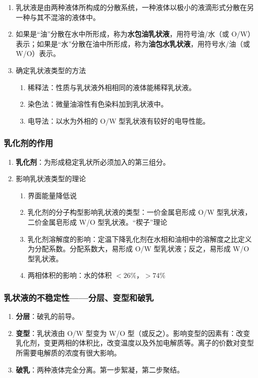 \begin{enumerate}
    \item 乳状液是由两种液体所构成的分散系统，一种液体以极小的液滴形式分散在另一种与其不混溶的液体中。
    \item 如果是“油”分散在水中所形成，称为\textbf{水包油乳状液}，用符号油/水（或 O/W）表示；如果是“水”分散在油中所形成，称为\textbf{油包水乳状液}，用符号水/油（或 W/O）表示。
    \item 确定乳状液类型的方法
    \begin{enumerate}
        \item 稀释法：性质与乳状液外相相同的液体能稀释乳状液。
        \item 染色法：微量油溶性有色染料加到乳状液中。
        \item 电导法：以水为外相的 O/W 型乳状液有较好的电导性能。
    \end{enumerate}
\end{enumerate}

\subsubsection{乳化剂的作用}

\begin{enumerate}
    \item \textbf{乳化剂}：为形成稳定乳状所必须加入的第三组分。
    \item 影响乳状液类型的理论
    \begin{enumerate}
        \item 界面能量降低说
        \item 乳化剂的分子构型影响乳状液的类型：一价金属皂形成 O/W 型乳状液，二价金属皂形成 W/O 型乳状液。“楔子”理论
        \item 乳化剂溶解度的影响：定温下降乳化剂在水相和油相中的溶解度之比定义为分配系数。分配系数大，易形成 O/W 型乳状液；反之，易形成 W/O 型乳状液。
        \item 两相体积的影响：水的体积 $< 26 \%$，$> 74 \%$
    \end{enumerate} 
\end{enumerate}

\subsubsection{乳状液的不稳定性——分层、变型和破乳}

\begin{enumerate}
    \item \textbf{分层}：破乳的前导。
    \item \textbf{变型}：乳状液由 O/W 型变为 W/O 型（或反之）。影响变型的因素有：改变乳化剂，变更两相的体积比，改变温度以及外加电解质等。离子的价数对变型所需要电解质的浓度有很大影响。
    \item \textbf{破乳}：两种液体完全分离。第一步絮凝，第二步聚结。
\end{enumerate}

